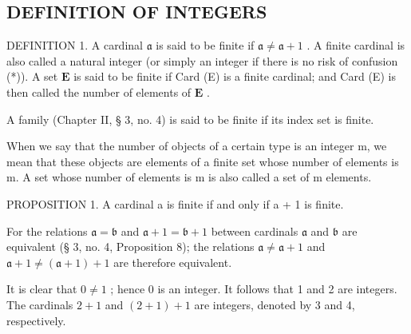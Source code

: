 \subsection{DEFINITION OF INTEGERS}

DEFINITION 1. A cardinal \(\mathfrak{a}\) is said to be finite if \(\mathfrak{a} \neq \mathfrak{a} + 1\) . A finite cardinal is also called a natural integer (or simply an integer if there is no risk of confusion (*)). A set \(\mathbf{E}\) is said to be finite if Card (E) is a finite cardinal; and Card (E) is then called the number of elements of \(\mathbf{E}\) .

A family (Chapter II, § 3, no. 4) is said to be finite if its index set is finite.

When we say that the number of objects of a certain type is an integer m, we mean that these objects are elements of a finite set whose number of elements is m. A set whose number of elements is m is also called a set of m elements.

PROPOSITION 1. A cardinal a is finite if and only if a + 1 is finite.

For the relations \(\mathfrak{a} = \mathfrak{b}\) and \(\mathfrak{a} + 1 = \mathfrak{b} + 1\) between cardinals \(\mathfrak{a}\) and \(\mathfrak{b}\) are equivalent (§ 3, no. 4, Proposition 8); the relations \(\mathfrak{a} \neq \mathfrak{a} + 1\) and \(\mathfrak{a} + 1 \neq (\mathfrak{a} + 1) + 1\) are therefore equivalent.

It is clear that \(0 \neq 1\) ; hence 0 is an integer. It follows that 1 and 2 are integers. The cardinals \(2 + 1\) and \((2 + 1) + 1\) are integers, denoted by 3 and 4, respectively.

